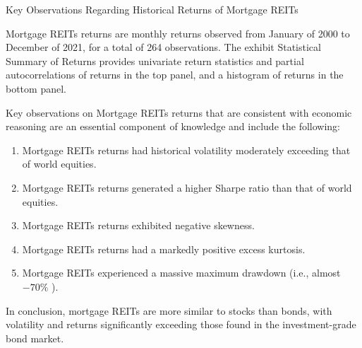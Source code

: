 \documentclass[11pt]{article}
\begin{document}
Key Observations Regarding Historical Returns of Mortgage REITs

Mortgage REITs returns are monthly returns observed from January of 2000 to December of 2021, for a total of 264 observations. The exhibit Statistical Summary of Returns provides univariate return statistics and partial autocorrelations of returns in the top panel, and a histogram of returns in the bottom panel.

Key observations on Mortgage REITs returns that are consistent with economic reasoning are an essential component of knowledge and include the following:

\begin{enumerate}
  \item Mortgage REITs returns had historical volatility moderately exceeding that of world equities.

  \item Mortgage REITs returns generated a higher Sharpe ratio than that of world equities.

  \item Mortgage REITs returns exhibited negative skewness.

  \item Mortgage REITs returns had a markedly positive excess kurtosis.

  \item Mortgage REITs experienced a massive maximum drawdown (i.e., almost $-70 \%$ ).

\end{enumerate}

In conclusion, mortgage REITs are more similar to stocks than bonds, with volatility and returns significantly exceeding those found in the investment-grade bond market.
\end{document}
